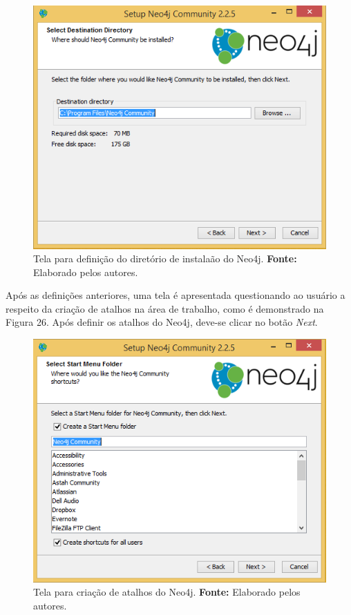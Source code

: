 \begin{figure}[h!]
	\centerline{\includegraphics[scale=0.4]{./imagens/neo4j-install-step3.png}}
	\caption[Tela para definição do diretório de instalaão do Neo4j]
	{Tela para definição do diretório de instalaão do Neo4j. \textbf{Fonte:} Elaborado pelos autores.}
	\label{fig:exemplo1}
\end{figure}

\par Após as definições anteriores, uma tela é apresentada questionando ao usuário a respeito da criação de atalhos na área de trabalho, como é demonstrado na Figura 26. Após definir os atalhos do Neo4j, deve-se clicar no botão \textit{Next}.

\begin{figure}[h!]
	\centerline{\includegraphics[scale=0.4]{./imagens/neo4j-install-step4.png}}
	\caption[Tela para criação de atalhos do Neo4j]
	{Tela para criação de atalhos do Neo4j. \textbf{Fonte:} Elaborado pelos autores.}
	\label{fig:exemplo1}
\end{figure}

